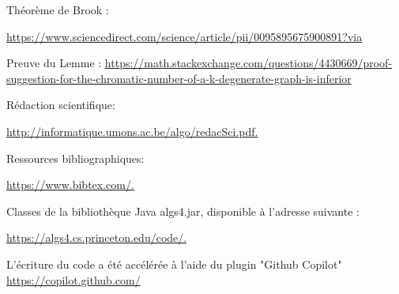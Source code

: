     Théorème de Brook :

    \href{https://www.sciencedirect.com/science/article/pii/0095895675900891?via%3Dihub}{https://www.sciencedirect.com/science/article/pii/0095895675900891?via%
    }

    Preuve du Lemme : \href{https://math.stackexchange.com/questions/4430669/proof-suggestion-for-the-chromatic-number-of-a-k-degenerate-graph-is-inferior}{https://math.stackexchange.com/questions/4430669/proof-suggestion-for-the-chromatic-number-of-a-k-degenerate-graph-is-inferior}

    Rédaction scientifique:

    \href{http://informatique.umons.ac.be/algo/redacSci.pdf.}{http://informatique.umons.ac.be/algo/redacSci.pdf.
    }

    Ressources bibliographiques:

    \href{https://www.bibtex.com/.}{https://www.bibtex.com/.}


    Classes de la bibliothèque Java
    algs4.jar, disponible à l’adresse suivante :

    \href{https://algs4.cs.princeton.edu/code/.}{https://algs4.cs.princeton.edu/code/.}

    L'écriture du code a été accélérée à l'aide du plugin "Github Copilot"
    \href{https://copilot.github.com/}{https://copilot.github.com/}


